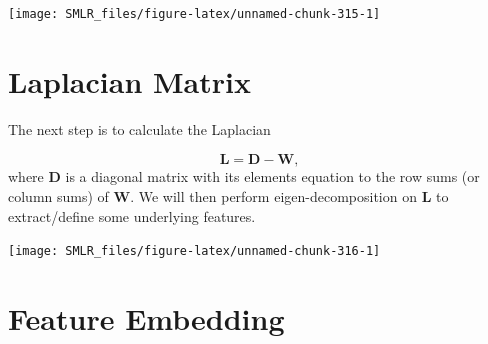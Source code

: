 \documentclass[
]{book}
\newenvironment{Shaded}{\begin{snugshade}}{\end{snugshade}}
\newcommand{\AttributeTok}[1]{\textcolor[rgb]{0.13,0.29,0.53}{#1}}
\newcommand{\CommentTok}[1]{\textcolor[rgb]{0.56,0.35,0.01}{\textit{#1}}}
\newcommand{\ConstantTok}[1]{\textcolor[rgb]{0.56,0.35,0.01}{#1}}
\newcommand{\DecValTok}[1]{\textcolor[rgb]{0.00,0.00,0.81}{#1}}
\newcommand{\FunctionTok}[1]{\textcolor[rgb]{0.13,0.29,0.53}{\textbf{#1}}}
\newcommand{\NormalTok}[1]{#1}
\newcommand{\OtherTok}[1]{\textcolor[rgb]{0.56,0.35,0.01}{#1}}
\newcommand{\SpecialCharTok}[1]{\textcolor[rgb]{0.81,0.36,0.00}{\textbf{#1}}}
\newcommand{\StringTok}[1]{\textcolor[rgb]{0.31,0.60,0.02}{#1}}
\theoremstyle{definition}
\theoremstyle{definition}
\theoremstyle{definition}
\theoremstyle{definition}
\theoremstyle{remark}
\begin{document}
\begin{center}\texttt{[image: SMLR\_files/figure-latex/unnamed-chunk-315-1]} \end{center}

\hypertarget{laplacian-matrix}{%
\section{Laplacian Matrix}\label{laplacian-matrix}}

The next step is to calculate the Laplacian

\[\mathbf{L} = \mathbf{D} - \mathbf{W},\]
where \(\mathbf{D}\) is a diagonal matrix with its elements equation to the row sums (or column sums) of \(\mathbf{W}\). We will then perform eigen-decomposition on \(\mathbf{L}\) to extract/define some underlying features.

\begin{Shaded}
\end{Shaded}

\begin{center}\texttt{[image: SMLR\_files/figure-latex/unnamed-chunk-316-1]} \end{center}

\hypertarget{feature-embedding}{%
\section{Feature Embedding}\label{feature-embedding}}
\end{document}
